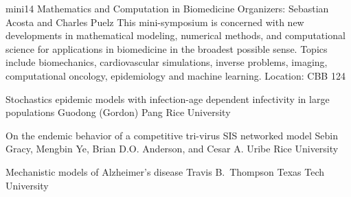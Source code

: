 \mini
{mini14}
{Mathematics and Computation in Biomedicine}
{Organizers: Sebastian Acosta and Charles Puelz}
{This mini-symposium is concerned with new developments in mathematical modeling, numerical methods, and computational science for applications in biomedicine in the broadest possible sense. Topics include biomechanics, cardiovascular simulations, inverse problems, imaging, computational oncology, epidemiology and machine learning.}
{Location: CBB 124}

\begin{talks}
\item\talk
{Stochastics epidemic models with infection-age dependent infectivity in large populations}
{Guodong (Gordon) Pang}
{Rice University}
\item\talk
{On the endemic behavior of a competitive tri-virus SIS networked model}
{Sebin Gracy, Mengbin Ye, Brian D.O. Anderson, and Cesar A. Uribe}
{Rice University}
\item\talk
{Mechanistic models of Alzheimer's disease}
{Travis B.~Thompson}
{Texas Tech University}
\end{talks}
\room
